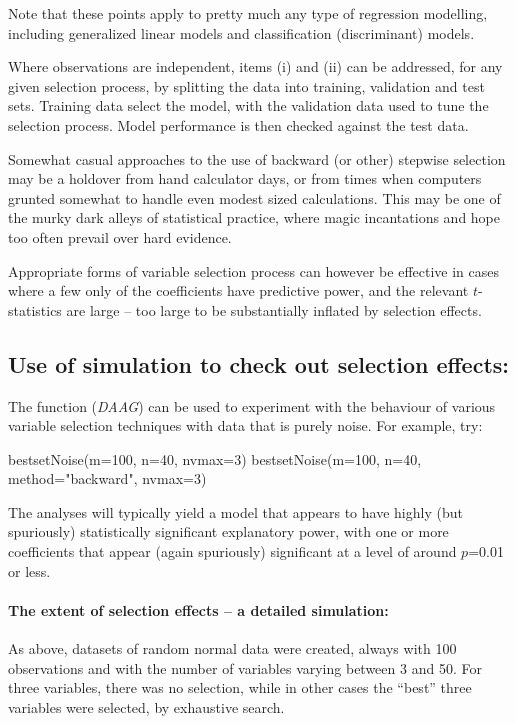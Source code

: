 Note that these points apply to pretty much any type of regression
modelling, including generalized linear models and classification
(discriminant) models.

Where observations are independent, items (i) and (ii) can be
addressed, for any given selection process, by splitting the data into
training, validation and test sets.  Training data select the model,
with the validation data used to tune the selection process.
Model performance is then checked against the test data.

Somewhat casual approaches to the use of backward (or other) stepwise
selection may be a holdover from hand calculator days, or from times
when computers grunted somewhat to handle even modest sized
calculations.  This may be one of the murky dark alleys of statistical
practice, where magic incantations and hope too often prevail over
hard evidence.

Appropriate forms of variable selection process can however be
effective in cases where a few only of the coefficients have
predictive power, and the relevant $t$-statistics are large --
too large to be substantially inflated by selection effects.

\subsection{Use of simulation to check out selection effects:}
The function  ({\em DAAG}) can be used to
experiment with the behaviour of various variable selection techniques
with data that is purely noise.  For example, try:

\begin{Schunk}
\begin{Sinput}
bestsetNoise(m=100, n=40, nvmax=3)
bestsetNoise(m=100, n=40, method="backward",
             nvmax=3)
\end{Sinput}
\end{Schunk}
The analyses will typically yield a model that appears to
have highly (but spuriously) statistically significant explanatory power,
with one or more coefficients that appear (again spuriously)
significant at a level of around $p$=0.01 or less.

\paragraph{The extent of selection effects -- a detailed simulation:}
As above, datasets of random normal data were created, always with 100
observations and with the number of variables varying between 3 and
50.  For three variables, there was no selection, while in other cases
the ``best'' three variables were selected, by exhaustive search.

